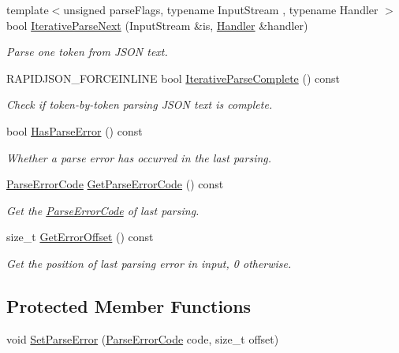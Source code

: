 \begin{DoxyCompactItemize}
{\footnotesize template$<$unsigned parse\+Flags, typename Input\+Stream , typename Handler $>$ }\\bool \mbox{\hyperlink{classrapidjson_1_1_generic_reader_abac6611bec17167de50fede5cd5194ca}{Iterative\+Parse\+Next}} (Input\+Stream \&is, \mbox{\hyperlink{classrapidjson_1_1_handler}{Handler}} \&handler)
\begin{DoxyCompactList}\small\item\em Parse one token from J\+S\+ON text. \end{DoxyCompactList}\item 
R\+A\+P\+I\+D\+J\+S\+O\+N\+\_\+\+F\+O\+R\+C\+E\+I\+N\+L\+I\+NE bool \mbox{\hyperlink{classrapidjson_1_1_generic_reader_a037aee35044b894d1487b42365aadc4b}{Iterative\+Parse\+Complete}} () const
\begin{DoxyCompactList}\small\item\em Check if token-\/by-\/token parsing J\+S\+ON text is complete. \end{DoxyCompactList}\item 
bool \mbox{\hyperlink{classrapidjson_1_1_generic_reader_ac42370c3497a0e2b6973110f298e3a59}{Has\+Parse\+Error}} () const
\begin{DoxyCompactList}\small\item\em Whether a parse error has occurred in the last parsing. \end{DoxyCompactList}\item 
\mbox{\hyperlink{group___r_a_p_i_d_j_s_o_n___e_r_r_o_r_s_ga7d3acf640886b1f2552dc8c4cd6dea60}{Parse\+Error\+Code}} \mbox{\hyperlink{classrapidjson_1_1_generic_reader_a042c621cf745c5ed3a6f5ff9418dd05e}{Get\+Parse\+Error\+Code}} () const
\begin{DoxyCompactList}\small\item\em Get the \mbox{\hyperlink{group___r_a_p_i_d_j_s_o_n___e_r_r_o_r_s_ga7d3acf640886b1f2552dc8c4cd6dea60}{Parse\+Error\+Code}} of last parsing. \end{DoxyCompactList}\item 
size\+\_\+t \mbox{\hyperlink{classrapidjson_1_1_generic_reader_ab50019e0a715320f83b7610b83dcef8f}{Get\+Error\+Offset}} () const
\begin{DoxyCompactList}\small\item\em Get the position of last parsing error in input, 0 otherwise. \end{DoxyCompactList}\end{DoxyCompactItemize}
\subsection*{Protected Member Functions}
\begin{DoxyCompactItemize}
\item 
void \mbox{\hyperlink{classrapidjson_1_1_generic_reader_a544704abdce535d93ae0f45d0cf0bc0d}{Set\+Parse\+Error}} (\mbox{\hyperlink{group___r_a_p_i_d_j_s_o_n___e_r_r_o_r_s_ga7d3acf640886b1f2552dc8c4cd6dea60}{Parse\+Error\+Code}} code, size\+\_\+t offset)
\end{DoxyCompactItemize}
